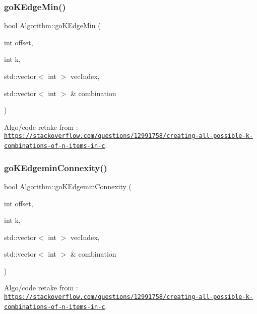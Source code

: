 \subsubsection{\texorpdfstring{go\+K\+Edge\+Min()}{goKEdgeMin()}}
{\footnotesize\ttfamily bool Algorithm\+::go\+K\+Edge\+Min (\begin{DoxyParamCaption}\item[{int}]{offset,  }\item[{int}]{k,  }\item[{std\+::vector$<$ int $>$}]{vec\+Index,  }\item[{std\+::vector$<$ int $>$ \&}]{combination }\end{DoxyParamCaption})}



Algo/code retake from \+: \href{https://stackoverflow.com/questions/12991758/creating-all-possible-k-combinations-of-n-items-in-c}{\tt https\+://stackoverflow.\+com/questions/12991758/creating-\/all-\/possible-\/k-\/combinations-\/of-\/n-\/items-\/in-\/c}. 

\mbox{\label{struct_algorithm_a1baf45c10fc672bea255be518c5c3173}} 
\subsubsection{\texorpdfstring{go\+K\+Edgemin\+Connexity()}{goKEdgeminConnexity()}}
{\footnotesize\ttfamily bool Algorithm\+::go\+K\+Edgemin\+Connexity (\begin{DoxyParamCaption}\item[{int}]{offset,  }\item[{int}]{k,  }\item[{std\+::vector$<$ int $>$}]{vec\+Index,  }\item[{std\+::vector$<$ int $>$ \&}]{combination }\end{DoxyParamCaption})}



Algo/code retake from \+: \href{https://stackoverflow.com/questions/12991758/creating-all-possible-k-combinations-of-n-items-in-c}{\tt https\+://stackoverflow.\+com/questions/12991758/creating-\/all-\/possible-\/k-\/combinations-\/of-\/n-\/items-\/in-\/c}. 

\mbox{\label{struct_algorithm_a6596dc464bb675414435c341a76cd2b6}} 
